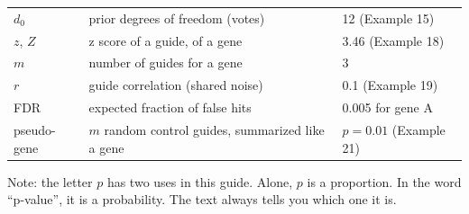 \begin{center}
\begin{tabular}{@{}l p{6.3cm} l@{}}
$d_0$ & prior degrees of freedom (votes) & 12 (Example 15)\\
$z$, $Z$ & z score of a guide, of a gene & 3.46 (Example 18)\\
$m$ & number of guides for a gene & 3\\
$r$ & guide correlation (shared noise) & 0.1 (Example 19)\\
FDR & expected fraction of false hits & 0.005 for gene A\\
pseudo-gene & $m$ random control guides, summarized like a gene & $p = 0.01$ (Example 21)\\
\bottomrule
\end{tabular}
\end{center}

Note: the letter $p$ has two uses in this guide. Alone, $p$ is a proportion.
In the word ``p-value'', it is a probability. The text always tells you
which one it is.


\newpage

